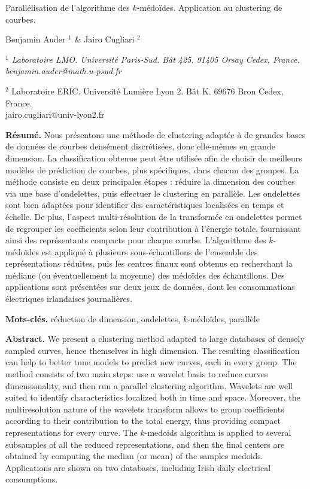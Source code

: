 \documentclass[12pt]{article}
\begin{document}

\begin{center}
{\Large
	{\sc Parallélisation de l'algorithme des $k$-médoïdes. Application au clustering de courbes.} %
}
\bigskip

Benjamin Auder $^{1}$ \& Jairo Cugliari $^{2}$
\bigskip

{\it
$^{1}$ Laboratoire LMO. Université Paris-Sud. Bât 425. 91405 Orsay Cedex, France.\\benjamin.auder@math.u-psud.fr

$^{2}$ Laboratoire ERIC. Université Lumière Lyon 2. Bât K. 69676 Bron Cedex, France.\\jairo.cugliari@univ-lyon2.fr
}
\end{center}
\bigskip


{\bf R\'esum\'e.} 
Nous présentons une méthode de clustering adaptée à de grandes bases de données de courbes densément discrétisées, donc elle-mêmes en grande dimension. 
La classification obtenue peut être utilisée afin de choisir de meilleurs modèles de prédiction de courbes, plus spécifiques, dans chacun des groupes. 
La méthode consiste en deux principales étapes : 
réduire la dimension des courbes via une base d'ondelettes, puis effectuer le clustering en parallèle. 
Les ondelettes sont bien adaptées pour identifier des caractéristiques localisées en temps et échelle. 
De plus, l'aspect multi-résolution de la transformée en ondelettes permet de regrouper les coefficients 
selon leur contribution à l'énergie totale, fournissant ainsi des représentants compacts pour chaque courbe. 
L'algorithme des $k$-médoïdes est appliqué à plusieurs sous-échantillons de l'ensemble des représentations réduites, 
puis les centres finaux sont obtenus en recherchant la médiane (ou éventuellement la moyenne) des médoïdes des échantillons. 
Des applications sont présentées sur deux jeux de données, dont les consommations électriques irlandaises journalières.
\smallskip

{\bf Mots-cl\'es.} réduction de dimension, ondelettes, $k$-médoïdes, parallèle
\bigskip\bigskip

{\bf Abstract.}
We present a clustering method adapted to large databases of densely sampled curves, hence themselves in high dimension. 
The resulting classification can help to better tune models to predict new curves, each in every group. 
The method consists of two main steps: 
use a wavelet basis to reduce curves dimensionality, and then run a parallel clustering algorithm. 
Wavelets are well suited to identify characteristics localized both in time and space. 
Moreover, the multiresolution nature of the wavelets transform allows to group coefficients according to their 
contribution to the total energy, thus providing compact representations for every curve. 
The $k$-medoids algorithm is applied to several subsamples of all the reduced representations, and then the final 
centers are obtained by computing the median (or mean) of the samples medoids. 
Applications are shown on two databases, including Irish daily electrical consumptions.
\smallskip
\end{document}
